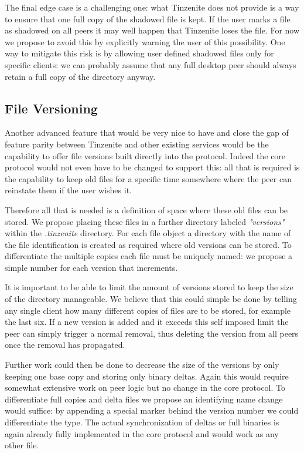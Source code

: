 The final edge case is a challenging one: what Tinzenite does not provide is a way to ensure that one full copy of the shadowed file is kept.
If the user marks a file as shadowed on all peers it may well happen that Tinzenite loses the file.
For now we propose to avoid this by explicitly warning the user of this possibility.
One way to mitigate this risk is by allowing user defined shadowed files only for specific clients: we can probably assume that any full desktop peer should always retain a full copy of the directory anyway.


\subsection{File Versioning}
\label{sub:File Versioning}

Another advanced feature that would be very nice to have and close the gap of feature parity between Tinzenite and other existing services would be the capability to offer file versions built directly into the protocol.
Indeed the core protocol would not even have to be changed to support this: all that is required is the capability to keep old files for a specific time somewhere where the peer can reinstate them if the user wishes it.

Therefore all that is needed is a definition of space where these old files can be stored.
We propose placing these files in a further directory labeled \textit{"versions"} within the \textit{.tinzenite} directory.
For each file object a directory with the name of the file identification is created as required where old versions can be stored.
To differentiate the multiple copies each file must be uniquely named: we propose a simple number for each version that increments.

It is important to be able to limit the amount of versions stored to keep the size of the directory manageable.
We believe that this could simple be done by telling any single client how many different copies of files are to be stored, for example the last six.
If a new version is added and it exceeds this self imposed limit the peer can simply trigger a normal removal, thus deleting the version from all peers once the removal has propagated.

Further work could then be done to decrease the size of the versions by only keeping one base copy and storing only binary deltas.
Again this would require somewhat extensive work on peer logic but no change in the core protocol.
To differentiate full copies and delta files we propose an identifying name change would suffice: by appending a special marker behind the version number we could differentiate the type.
The actual synchronization of deltas or full binaries is again already fully implemented in the core protocol and would work as any other file.
